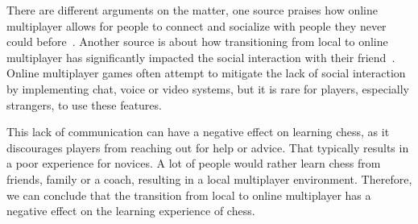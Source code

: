 There are different arguments on the matter, one source praises how online multiplayer allows for people to connect and
socialize with people they never could before~\cite{multiplayer-online}.
Another source is about how transitioning from local to online multiplayer has significantly impacted the social
interaction with their friend~\cite{multiplayer-local}.
Online multiplayer games often attempt to mitigate the lack of social interaction by implementing chat, voice or video
systems, but it is rare for players, especially strangers, to use these features.

This lack of communication can have a negative effect on learning chess, as it discourages players from reaching out
for help or advice.
That typically results in a poor experience for novices.
A lot of people would rather learn chess from friends, family or a coach, resulting in a local multiplayer environment.
Therefore, we can conclude that the transition from local to online multiplayer has a negative effect on the learning
experience of chess.
